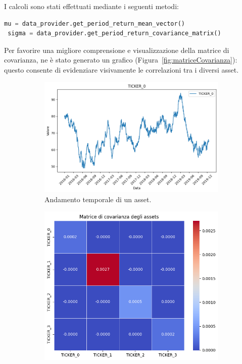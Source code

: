 I calcoli sono stati effettuati mediante i seguenti metodi:
\begin{lstlisting}[language=python, caption={Calcolo dei rendimenti attesi e della matrice di covarianza.}]
 mu = data_provider.get_period_return_mean_vector()
 sigma = data_provider.get_period_return_covariance_matrix()
\end{lstlisting}

Per favorire una migliore comprensione e visualizzazione della matrice di 
covarianza, ne è stato generato un grafico (Figura~\ref{fig:matriceCovarianza}): 
questo consente di evidenziare visivamente le correlazioni tra i diversi asset.

\begin{figure}[h!]
    \centering
    \begin{subfigure}{0.52\textwidth}
        \centering
        \includegraphics[width=\textwidth]{images/graficoAsset.png}
        \caption{Andamento temporale di un asset.}
        \label{fig:graficiAssets}
    \end{subfigure}
    \hfill
    \begin{subfigure}{0.45\textwidth}
        \centering
        \includegraphics[width=\textwidth]{images/matriceCovarianza.png}

\end{subfigure}
\end{figure}

